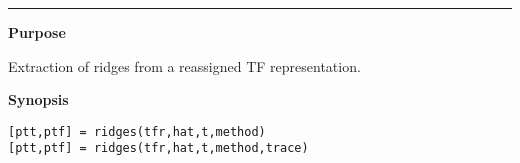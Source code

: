 


\hspace*{-1.6cm}{\Large \bf ridges}

\vspace*{-.4cm}
\hspace*{-1.6cm}\rule[0in]{16.5cm}{.02cm}
\vspace*{.2cm}



{\bf \large {}\selectfont Purpose}\\
\hspace*{1.5cm}
\begin{minipage}[t]{13.5cm}
Extraction of ridges from a reassigned TF representation.
\end{minipage}
\vspace*{.5cm}


{\bf \large {}\selectfont Synopsis}\\
\hspace*{1.5cm}
\begin{minipage}[t]{13.5cm}
\begin{verbatim}
[ptt,ptf] = ridges(tfr,hat,t,method)
[ptt,ptf] = ridges(tfr,hat,t,method,trace)
\end{verbatim}
\end{minipage}
\vspace*{.5cm}


